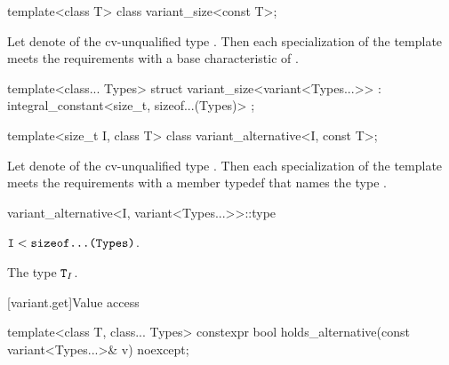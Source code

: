 %
\begin{itemdecl}
template<class T> class variant_size<const T>;
\end{itemdecl}

\begin{itemdescr}
\pnum
Let  denote  of the cv-unqualified
type . Then each specialization of the template meets the
 requirements with a
base characteristic of .
\end{itemdescr}

%
\begin{itemdecl}
template<class... Types>
  struct variant_size<variant<Types...>> : integral_constant<size_t, sizeof...(Types)> { };
\end{itemdecl}

%
\begin{itemdecl}
template<size_t I, class T> class variant_alternative<I, const T>;
\end{itemdecl}

\begin{itemdescr}
\pnum
Let  denote  of the
cv-unqualified type . Then each specialization of the template
meets the  requirements with a
member typedef  that names the type .
\end{itemdescr}

%
\begin{itemdecl}
variant_alternative<I, variant<Types...>>::type
\end{itemdecl}

\begin{itemdescr}
\pnum
\mandates
$\texttt{I} < \texttt{sizeof...(Types)}$.

\pnum
\ctype
The type $\texttt{T}_I$.
\end{itemdescr}

[variant.get]{Value access}

\begin{itemdecl}
template<class T, class... Types>
  constexpr bool holds_alternative(const variant<Types...>& v) noexcept;
\end{itemdecl}

